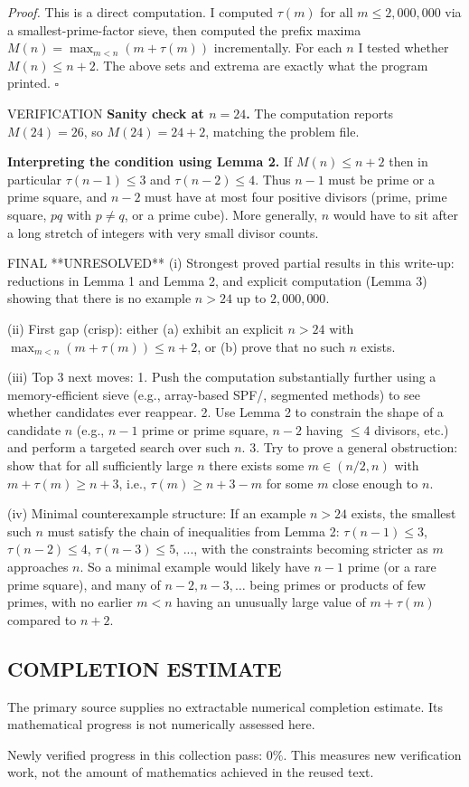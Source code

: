 \emph{Proof.}
This is a direct computation.
I computed $\tau(m)$ for all $m\le 2{,}000{,}000$ via a smallest-prime-factor
sieve, then computed the prefix maxima
$M(n)=\max_{m<n}(m+\tau(m))$ incrementally.
For each $n$ I tested whether $M(n)\le n+2$.
The above sets and extrema are exactly what the program printed.
\hfill $\square$

VERIFICATION
\textbf{Sanity check at $n=24$.}
The computation reports $M(24)=26$, so $M(24)=24+2$, matching the problem file.

\textbf{Interpreting the condition using Lemma 2.}
If $M(n)\le n+2$ then in particular $\tau(n-1)\le 3$ and $\tau(n-2)\le 4$.
Thus $n-1$ must be prime or a prime square, and $n-2$ must have at most four
positive divisors (prime, prime square, $pq$ with $p\neq q$, or a prime cube).
More generally, $n$ would have to sit after a long stretch of integers with very
small divisor counts.

FINAL
**UNRESOLVED**
(i) Strongest proved partial results in this write-up: reductions in Lemma 1 and
Lemma 2, and explicit computation (Lemma 3) showing that there is no example
$n>24$ up to $2{,}000{,}000$.

(ii) First gap (crisp): either (a) exhibit an explicit $n>24$ with
$\max_{m<n}(m+\tau(m))\le n+2$, or (b) prove that no such $n$ exists.

(iii) Top 3 next moves:
1. Push the computation substantially further using a memory-efficient sieve
(e.g., array-based SPF/\tau, segmented methods) to see whether candidates ever
reappear.
2. Use Lemma 2 to constrain the shape of a candidate $n$ (e.g., $n-1$ prime or
prime square, $n-2$ having $\le4$ divisors, etc.) and perform a targeted search
over such $n$.
3. Try to prove a general obstruction: show that for all sufficiently large $n$
there exists some $m\in(n/2,n)$ with $m+\tau(m)\ge n+3$, i.e.,
$\tau(m)\ge n+3-m$ for some $m$ close enough to $n$.

(iv) Minimal counterexample structure:
If an example $n>24$ exists, the smallest such $n$ must satisfy the chain of
inequalities from Lemma 2:
$\tau(n-1)\le 3$, $\tau(n-2)\le 4$, $\tau(n-3)\le 5$, ..., with the constraints
becoming stricter as $m$ approaches $n$.
So a minimal example would likely have $n-1$ prime (or a rare prime square), and
many of $n-2,n-3,\dots$ being primes or products of few primes, with no earlier
$m<n$ having an unusually large value of $m+\tau(m)$ compared to $n+2$.


\subsection*{COMPLETION ESTIMATE}
The primary source supplies no extractable numerical completion estimate. Its mathematical progress is not numerically assessed here.

Newly verified progress in this collection pass: $0\%$. This measures new verification work, not the amount of mathematics achieved in the reused text.
